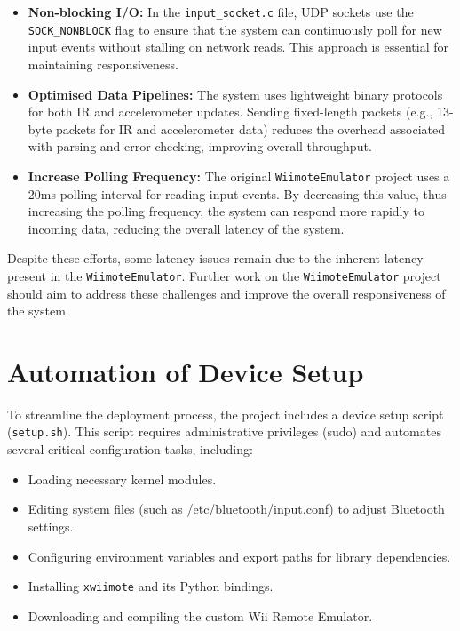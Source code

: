\begin{itemize}
	\item \textbf{Non-blocking I/O:} In the \texttt{input\_socket.c} file, UDP
	      sockets use the \texttt{SOCK\_NONBLOCK} flag to ensure that the
	      system can continuously poll for new input events without stalling on network
	      reads. This approach is essential for maintaining responsiveness.

	\item \textbf{Optimised Data Pipelines:} The system uses lightweight binary
	      protocols for both IR and accelerometer updates. Sending fixed-length packets
	      (e.g., 13-byte packets for IR and accelerometer data) reduces the overhead associated
	      with parsing and error checking, improving overall throughput.

	\item \textbf{Increase Polling Frequency:} The original
	      \texttt{WiimoteEmulator} project uses a 20ms polling interval for reading input
	      events. By decreasing this value, thus increasing the polling frequency, the
	      system can respond more rapidly to incoming data, reducing the overall latency
	      of the system.

\end{itemize}

Despite these efforts, some latency issues remain due to the inherent latency present in the \texttt{WiimoteEmulator}. Further work on the \texttt{WiimoteEmulator} project should aim to address these challenges and improve the overall responsiveness of the system.

\section{Automation of Device Setup}

To streamline the deployment process, the project includes a device setup script (\texttt{setup.sh}). This script requires administrative privileges (sudo) and automates several critical configuration tasks, including:

\begin{itemize}

	\item Loading necessary kernel modules.
	\item Editing system files (such as /etc/bluetooth/input.conf) to adjust Bluetooth settings.
	\item Configuring environment variables and export paths for library dependencies.
	\item Installing \texttt{xwiimote} and its Python bindings.
	\item Downloading and compiling the custom Wii Remote Emulator.
\end{itemize}

